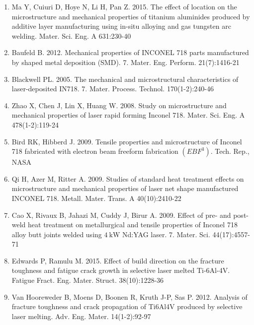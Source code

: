 \documentclass[10pt]{article}
\begin{document}
\begin{enumerate}
  \item Ma Y, Cuiuri D, Hoye N, Li H, Pan Z. 2015. The effect of location on the microstructure and mechanical properties of titanium aluminides produced by additive layer manufacturing using in-situ alloying and gas tungsten arc welding. Mater. Sci. Eng. A 631:230-40

  \item Baufeld B. 2012. Mechanical properties of INCONEL 718 parts manufactured by shaped metal deposition (SMD). 7. Mater. Eng. Perform. 21(7):1416-21

  \item Blackwell PL. 2005. The mechanical and microstructural characteristics of laser-deposited IN718. 7. Mater. Process. Technol. 170(1-2):240-46

  \item Zhao X, Chen J, Lin X, Huang W. 2008. Study on microstructure and mechanical properties of laser rapid forming Inconel 718. Mater. Sci. Eng. A 478(1-2):119-24

  \item Bird RK, Hibberd J. 2009. Tensile properties and microstructure of Inconel 718 fabricated with electron beam freeform fabrication $\left(E B F^{3}\right)$. Tech. Rep., NASA

  \item Qi H, Azer M, Ritter A. 2009. Studies of standard heat treatment effects on microstructure and mechanical properties of laser net shape manufactured INCONEL 718. Metall. Mater. Trans. A 40(10):2410-22

  \item Cao X, Rivaux B, Jahazi M, Cuddy J, Birur A. 2009. Effect of pre- and post-weld heat treatment on metallurgical and tensile properties of Inconel 718 alloy butt joints welded using $4 \mathrm{~kW}$ Nd:YAG laser. 7. Mater. Sci. 44(17):4557-71

  \item Edwards P, Ramulu M. 2015. Effect of build direction on the fracture toughness and fatigue crack growth in selective laser melted Ti-6Al-4V. Fatigue Fract. Eng. Mater. Struct. 38(10):1228-36

  \item Van Hooreweder B, Moens D, Boonen R, Kruth J-P, Sas P. 2012. Analysis of fracture toughness and crack propagation of Ti6Al4V produced by selective laser melting. Adv. Eng. Mater. 14(1-2):92-97

\end{enumerate}
\end{document}
